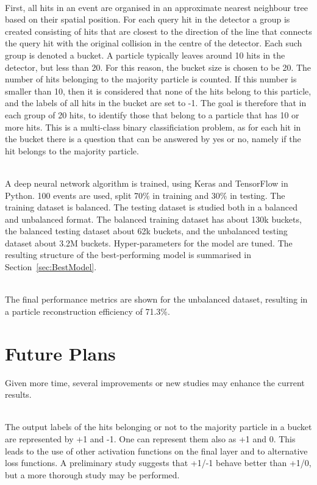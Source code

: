 \ \\First, all hits in an event are organised in an approximate nearest neighbour tree based on their spatial position. For each query hit in the detector a group is created consisting of hits that are closest to the direction of the line that connects the query hit with the original collision in the centre of the detector. Each such group is denoted a bucket. A particle typically leaves around 10 hits in the detector, but less than 20. For this reason, the bucket size is chosen to be 20. The number of hits belonging to the majority particle is counted. If this number is smaller than 10, then it is considered that none of the hits belong to this particle, and the labels of all hits in the bucket are set to -1. The goal is therefore that in each group of 20 hits, to identify those that belong to a particle that has 10 or more hits. This is a multi-class binary classificiation problem, as for each hit in the bucket there is a question that can be answered by yes or no, namely if the hit belongs to the majority particle.

\ \\A deep neural network algorithm is trained, using Keras and TensorFlow in Python. 100 events are used, split 70\% in training and 30\% in testing. The training dataset is balanced. The testing dataset is studied both in a balanced and unbalanced format. The balanced training dataset has about 130k buckets, the balanced testing dataset about 62k buckets, and the unbalanced testing dataset about 3.2M buckets. Hyper-parameters for the model are tuned. The resulting structure of the best-performing model is summarised in Section~\ref{sec:BestModel}.

\ \\The final performance metrics are shown for the unbalanced dataset, resulting in a particle reconstruction efficiency of 71.3\%. 

\section{Future Plans}

Given more time, several improvements or new studies may enhance the current results.

\ \\The output labels of the hits belonging or not to the majority particle in a bucket are represented by +1 and -1. One can represent them also as +1 and 0. This leads to the use of other activation functions on the final layer and to alternative loss functions. A preliminary study suggests that +1/-1 behave better than +1/0, but a more thorough study may be performed. 

